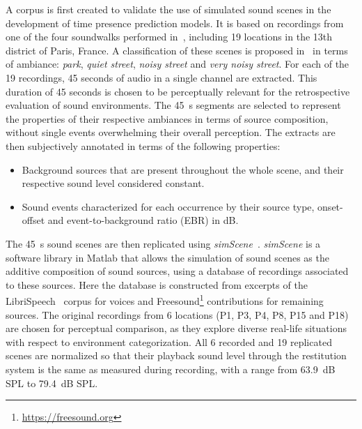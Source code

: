 \documentclass[11pt,a4paper]{article}
\begin{document}
A corpus is first created to validate the use of simulated sound scenes in the development of time presence prediction models. It is based on recordings from one of the four soundwalks performed in~\cite{aumond2017}, including 19 locations in the 13th district of Paris, France. A classification of these scenes is proposed in~\cite{gloaguen2017} in terms of ambiance: \textit{park}, \textit{quiet street}, \textit{noisy street} and \textit{very noisy street}. For each of the 19 recordings, 45 seconds of audio in a single channel are extracted. This duration of 45 seconds is chosen to be perceptually relevant for the retrospective evaluation of sound environments. The 45~s segments are selected to represent the properties of their respective ambiances in terms of source composition, without single events overwhelming their overall perception. The extracts are then subjectively annotated in terms of the following properties:

\begin{itemize}
\item Background sources that are present throughout the whole scene, and their respective sound level considered constant.
\item Sound events characterized for each occurrence by their source type, onset-offset and event-to-background ratio (EBR) in dB.
\end{itemize}

The 45~s sound scenes are then replicated using \textit{simScene}~\cite{rossignol2015}. \textit{simScene} is a software library in Matlab that allows the simulation of sound scenes as the additive composition of sound sources, using a database of recordings associated to these sources. Here the database is constructed from excerpts of the LibriSpeech~\cite{panayotov2015} corpus for voices and Freesound\footnote{\url{https://freesound.org}} contributions for remaining sources. The original recordings from 6 locations (P1, P3, P4, P8, P15 and P18) are chosen for perceptual comparison, as they explore diverse real-life situations with respect to environment categorization. All 6 recorded and 19 replicated scenes are normalized so that their playback sound level through the restitution system is the same as measured during recording, with a range from 63.9~dB SPL to 79.4~dB SPL.
\end{document}
